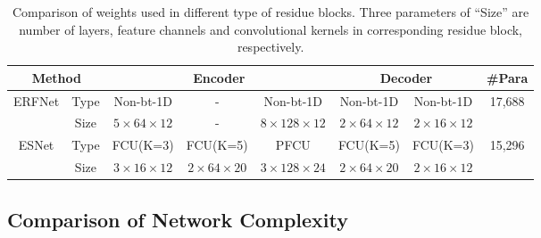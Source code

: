 \documentclass[runningheads]{llncs}
\begin{document}
\begin{table}[!t]
\tabcolsep 0.3mm \caption{Comparison of weights used in different type of residue blocks. Three parameters of ``Size'' are number of layers, feature channels and convolutional kernels in corresponding residue block, respectively.}
\begin{center}
\begin{tabular}{|c|c||c|c|c|c|c|c|}
\hline
\multicolumn{2}{|c||}{Method}     & \multicolumn{3}{c|}{Encoder}     & \multicolumn{2}{c|}{Decoder} & \#Para                 \\ \hline \hline
\multirow{2}{*}{ERFNet\cite{Romera2018erfnet}} & Type   & Non-bt-1D & -        & Non-bt-1D & Non-bt-1D     & Non-bt-1D    & \multirow{2}{*}{17,688} \\ \cline{2-7}
                        & Size & $5\times64\times12$   & -        & $8\times128\times12$  & $2\times64\times12$       & $2\times16\times12$      &                        \\ \hline
\multirow{2}{*}{ESNet}   & Type   & FCU(K=3)  & FCU(K=5) & PFCU      & FCU(K=5)      & FCU(K=3)     & \multirow{2}{*}{15,296} \\ \cline{2-7}
                        & Size & $3\times16\times12$   & $2\times64\times20$  & $3\times128\times24$  & $2\times64\times20$       & $2\times16\times12$      &                        \\ \hline
\end{tabular}
\end{center}\label{tab:Complexity}
\end{table}

\subsection{Comparison of Network Complexity}
\end{document}
